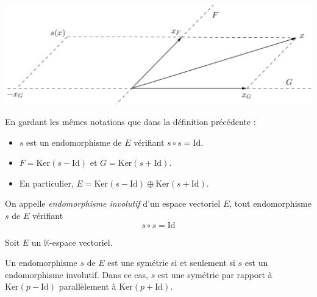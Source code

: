 \documentclass[french,11pt,twoside]{VcCours}
\begin{document}
\begin{center}
\includegraphics[scale=0.37]{Symetrie1}
\end{center}

\begin{Proposition}{} En gardant les mêmes notations que dans la définition précédente :
\begin{itemize}
\item $s$ est un endomorphisme de $E$ vérifiant $s \circ s = \textrm{Id}$.
\item $F = \textrm{Ker}(s-\textrm{Id})$ et $G= \textrm{Ker}(s+\textrm{Id})$.
\item En particulier, $E= \textrm{Ker}(s-\textrm{Id}) \oplus \textrm{Ker}(s+\textrm{Id})$.
\end{itemize}
\end{Proposition}

\begin{Demonstration}{}
\vspace{8cm}
\newpage
\phantom{test}

\vspace{7.5cm}

\end{Demonstration}

\begin{Definition}{} 
On appelle \emph{endomorphisme involutif} 
d'un espace vectoriel $E$, tout endomorphisme $s$ de $E$ vérifiant
\[s \circ s = \textrm{Id}\]
\end{Definition}

\begin{Proposition}{} Soit $E$ un $\mathbb{K}$-espace vectoriel.

Un endomorphisme $s$ de $E$ est une symétrie si et seulement si $s$ est un 
endomorphisme involutif. Dans ce cas, $s$ est une symétrie par rapport à 
$\textrm{Ker}(p-\textrm{Id})$ parallèlement à $\textrm{Ker}(p+\textrm{Id})$.
\end{Proposition}

\newpage

\vspace*{7cm}
\end{document}

